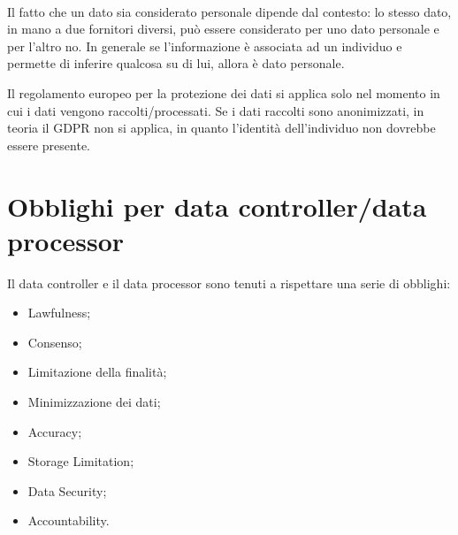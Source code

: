 \noindent \\Il fatto che un dato sia considerato personale dipende dal contesto: lo stesso dato, in mano a due fornitori diversi, può essere considerato per uno dato personale e per l'altro no. In generale se l'informazione è associata ad un individuo e permette di inferire qualcosa su di lui, allora è dato personale. 

Il regolamento europeo per la protezione dei dati si applica solo nel momento in cui i dati vengono raccolti/processati. Se i dati raccolti sono anonimizzati, in teoria il GDPR non si applica, in quanto l'identità dell'individuo non dovrebbe essere presente. 

\section{Obblighi per data controller/data processor}
Il data controller e il data processor sono tenuti a rispettare una serie di obblighi:
\begin{itemize}
    \item Lawfulness;
    \item Consenso;
    \item Limitazione della finalità;
    \item Minimizzazione dei dati;
    \item Accuracy;
    \item Storage Limitation;
    \item Data Security;
    \item Accountability.
\end{itemize}

